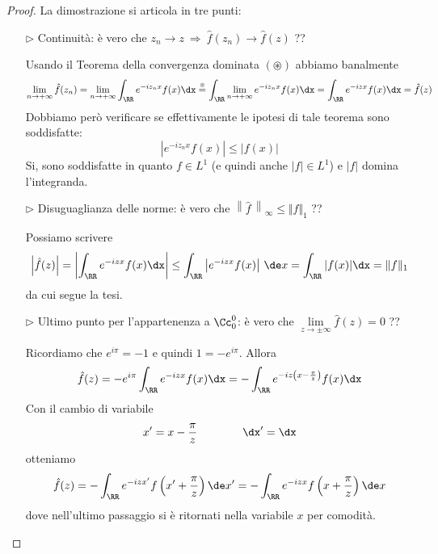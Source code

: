 \begin{proof}
La dimostrazione si articola in tre punti:
\begin{enumerate}
    \item [$\triangleright$] Continuità: è vero che $z_n\to z\ \Rightarrow\ \hat{f}(z_n)\to\hat{f}(z)$ ??

    Usando il Teorema della convergenza dominata $(\circledast)$ abbiamo banalmente
    \begin{equation*}
    \lim\limits_{n\rightarrow + \infty}\hat{f}(z_n)=\lim\limits_{n\rightarrow + \infty}\int_{\RR} e^{- iz_{n} x} f(x) \dx \overset{\underset{\circledast}{}}{=} \int_{\RR}\lim\limits_{n\rightarrow + \infty} e^{- iz_{n} x} f(x) \dx = \int_{\RR} e^{- izx} f(x) \dx = \hat{f}(z)
    \end{equation*}
    Dobbiamo però verificare se effettivamente le ipotesi di tale teorema sono soddisfatte:
    \begin{equation*}
    \left| e^{- iz_{n} x} f(x)\right|\leq |f(x)|
    \end{equation*}
    Si, sono soddisfatte in quanto $f\in L^1$ (e quindi anche $|f|\in L^1$) e $|f|$ domina l'integranda.


    \item [$\triangleright$] Disuguaglianza delle norme: è vero che $\left\|\hat{f}\,\right\|_{\infty} \leq \Vert f \Vert_{1}$ ??

    Possiamo scrivere
    \begin{equation*}
    \left| \hat{f}(z)\right| = \left| \int_{\RR} e^{- izx} f(x) \dx\right| \leq \int_\RR \left| e^{- izx} f(x)\right|\,\de x=\int_\RR |f(x)|\dx= \Vert f \Vert_{1}
    \end{equation*}
    da cui segue la tesi.

    \item [$\triangleright$] Ultimo punto per l'appartenenza a $\Cc_0^0$: è vero che $\lim\limits_{z\to \pm \infty}\hat{f}(z) = 0$ ??

    Ricordiamo che $e^{i\pi}=-1$ e quindi $1=-e^{i\pi}$. Allora
    \begin{equation*}
    \hat{f}(z) = - e^{i\pi}\int_{\RR} e^{- izx} f(x) \dx = - \int_{\RR} e^{- iz\left(x - \frac{\pi}{z}\right)} f(x) \dx
    \end{equation*}
    Con il cambio di variabile
    \begin{equation*}
    x' = x - \frac{\pi}{z} \qquad\qquad \dx'=\dx
    \end{equation*}
    otteniamo
    \begin{equation*}
    \hat{f}(z) = - \int_{\RR} e^{- izx'} f\left(x' + \frac{\pi}{z}\right) \de x' = - \int_{\RR} e^{- izx} f\left(x + \frac{\pi}{z}\right) \de x
    \end{equation*}
    dove nell'ultimo passaggio si è ritornati nella variabile $x$ per comodità.


\end{enumerate}
\end{proof}
